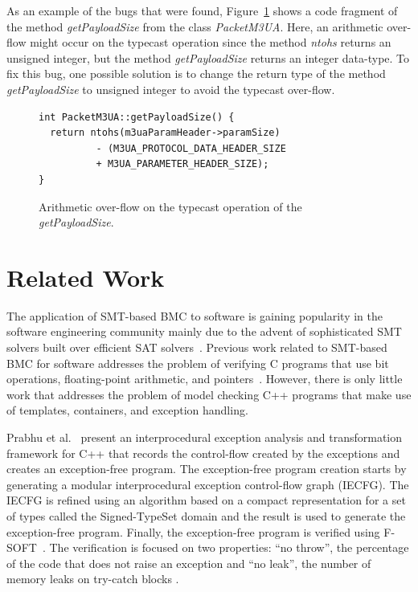 \documentclass[conference]{IEEEtran}
\begin{document}
As an example of the bugs that were found, Figure~\ref{figure:PacketM3UA} shows
a code fragment of the method \textit{getPayloadSize} from the class \textit{PacketM3UA}.
Here, an arithmetic over-flow might occur on the typecast operation since the method
\textit{ntohs} returns an unsigned integer, but the method \textit{getPayloadSize} returns
an integer data-type. To fix this bug, one possible solution is to change the return type
of the method \textit{getPayloadSize} to unsigned integer to avoid the typecast over-flow.

\begin{figure}[ht]
\centering
\begin{minipage}{0.45\textwidth}
\begin{lstlisting}
int PacketM3UA::getPayloadSize() {
  return ntohs(m3uaParamHeader->paramSize)
          - (M3UA_PROTOCOL_DATA_HEADER_SIZE
          + M3UA_PARAMETER_HEADER_SIZE);
}
\end{lstlisting}
\end{minipage}
\caption{Arithmetic over-flow on the typecast operation of the \textit{getPayloadSize}.}
\label{figure:PacketM3UA}
\end{figure}

\section{Related Work}
\label{related-work}

The application of SMT-based BMC to software is gaining
popularity in the software engineering community mainly due
to the advent of sophisticated SMT solvers built over efficient
SAT solvers~\cite{CVC07,Boolector09,Z08}.
Previous work related to
SMT-based BMC for software addresses the problem of verifying C programs
that use bit operations, floating-point arithmetic, and
pointers~\cite{Clarke04,Armando09,Ganai06,Cordeiro12}.
However, there is only little work that addresses the problem
of model checking C++ programs that make use of templates, containers,
and exception handling.

Prabhu et al.~\cite{PrabhuMBIG11} present an interprocedural
exception analysis and transformation framework for C++ that
records the control-flow created by the exceptions
and creates an exception-free program. The exception-free
program creation starts by generating a modular interprocedural
exception control-flow graph (IECFG). The IECFG is refined using
an algorithm based on a compact representation for a set of types
called the Signed-TypeSet domain and the result is used
to generate the exception-free program. Finally, the exception-free
program is verified using F-SOFT~\cite{Fsoft}. The verification is
focused on two properties: ``no throw'', the percentage of the code
that does not raise an exception and ``no leak'', the number of memory
leaks on try-catch blocks \cite{PrabhuMBIG11}.
\end{document}
